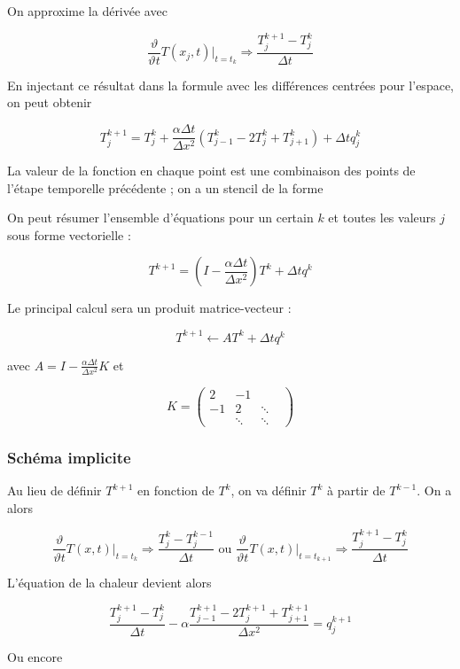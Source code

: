 		On approxime la dérivée avec
		
		$$\frac{\vartheta}{\vartheta t} T(x_j, t) \vert_{t = t_k} \Rightarrow \frac{T_j^{k + 1} - T_j^k}{\Delta t}$$
		
		En injectant ce résultat dans la formule avec les différences centrées pour l'espace, on peut obtenir
		
		$$T^{k + 1}_j = T_j^k + \frac{\alpha \Delta t}{\Delta x^2}(T_{j - 1}^k - 2T_j^k + T^k_{j + 1}) + \Delta tq_j^k$$
		
		La valeur de la fonction en chaque point est une combinaison des points de l'étape temporelle précédente ; on a un stencil de la forme
		
		
		On peut résumer l'ensemble d'équations pour un certain $k$ et toutes les valeurs $j$ sous forme vectorielle :
		
		$$T^{k + 1} = (I - \frac{\alpha \Delta t}{\Delta x^2})T^k + \Delta t q^k$$
		
		
		Le principal calcul sera un produit matrice-vecteur :
		
		$$T^{k + 1} \leftarrow A T^k + \Delta t q^k$$
		
		avec $A = I - \frac{\alpha \Delta t}{\Delta x^2} K$ et
		
		$$K = \begin{pmatrix}
2 & -1 & &  \\ 
-1 & 2 & \ddots  &\\ 
  & \ddots & \ddots &
\end{pmatrix} $$
		
		\subsubsection{Schéma implicite}
		
		Au lieu de définir $T^{k + 1}$ en fonction de $T^k$, on va définir $T^k$ à partir de $T^{k - 1}$. On a alors
		
		$$\frac{\vartheta}{\vartheta t} T(x, t) \vert_{t = t_k} \Rightarrow \frac{T_j^k - T_j^{k - 1}}{\Delta t} \text{    ou    } \frac{\vartheta}{\vartheta t} T(x, t) \vert_{t = t_{k + 1}} \Rightarrow \frac{T_j^{k + 1} - T_j^k}{\Delta t}$$
		
		L'équation de la chaleur devient alors
		
		$$\frac{T_j^{k + 1} - T_j^k}{\Delta t} - \alpha \frac{T_{j - 1}^{k + 1} - 2 T^{k + 1}_j + T_{j + 1}^{k + 1}}{\Delta x^2} = q_j^{k + 1}$$
		
		Ou encore
		
